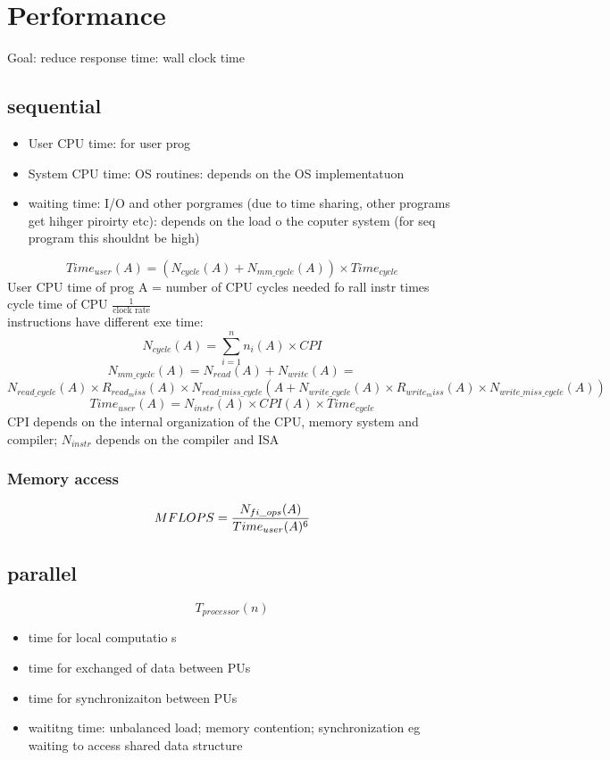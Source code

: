 \documentclass{article}
\begin{document}
\section{Performance}
Goal: reduce response time: wall clock time

\subsection{sequential}

\begin{itemize}
    \item User CPU time: for user prog
    \item System CPU time: OS routines: depends on the OS implementatuon 
    \item waiting time: I/O and other porgrames (due to time sharing, other programs get hihger piroirty etc): depends on the load o the coputer system (for seq program this shouldnt be high)
\end{itemize}
\[Time_{user}(A) =\left( N_{cycle}(A) + N_{mm\_cycle}(A)\right)\times Time_{cycle}\]
User CPU time of prog A = number of CPU cycles needed fo rall instr times cycle time of CPU $\frac{1}{\text{clock rate}}$\\
instructions have different exe time: 
\[N_{cycle}(A) = \sum_{i=1}^{n}n_i(A)\times CPI\]
\[ N_{mm\_cycle}(A) = N_{read}(A) + N_{write}(A) = \]\[N_{read\_cycle}(A) \times R_{read_miss}(A) \times N_{read\_miss\_cycle}(A + 
N_{write\_cycle}(A) \times R_{write_miss}(A) \times N_{write\_miss\_cycle}(A))\]
\[Time_{user}(A) = N_{instr}(A) \times CPI(A) \times Time_{cycle}\]
CPI depends on the internal organization of the CPU, memory system and compiler; $N_{instr}$ depends on the compiler and ISA\\
\subsubsection*{Memory access}

\[MFLOPS = \frac{N_{fi\_ops}(A)}{Time_{user}(A)\time 10^6}\]

\subsection{parallel}
\[T_{processor}(n)\]
\begin{itemize}
    \item time for local computatio s
    \item time for exchanged of data between PUs
    \item time for synchronizaiton between PUs
    \item waititng time: unbalanced load; memory contention; synchronization eg waiting to access shared data structure
\end{itemize}
\end{document}
